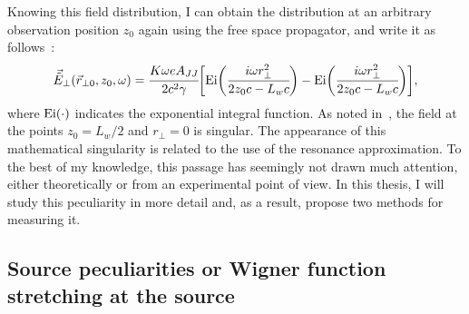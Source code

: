     Knowing this field distribution, I can obtain the distribution at an arbitrary observation position $z_0$ again using the free space propagator, and write it as follows~\cite{geloni_fourier_2007}:    
    \begin{align}
        \vec{\tilde{E}}_{\perp}(\vec{r}_{\perp 0}, z_0, \omega) = \cfrac{K \omega e A_{JJ}}{2 c^2 \gamma} \bigg[\textup{Ei}\bigg(\cfrac{i \omega r^2_{\perp}}{2z_0 c - L_w c}\bigg) - \textup{Ei}\bigg(\cfrac{i \omega r^2_{\perp}}{2z_0 c - L_w c}\bigg) \bigg],
    \end{align}
    where $\textup{Ei}(\cdot)$ indicates the exponential integral function. As noted in~\cite{geloni_fourier_2007}, the field at the points $z_0 = L_w/2$ and $r_{\perp} = 0$ is singular. The appearance of this mathematical singularity is related to the use of the resonance approximation. To the best of my knowledge, this passage has seemingly not drawn much attention, either theoretically or from an experimental point of view. In this thesis, I will study this peculiarity in more detail and, as a result, propose two methods for measuring it.
    
\subsection{Source peculiarities or Wigner function stretching at the source}

